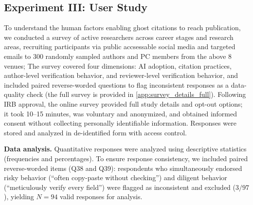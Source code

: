 \subsection{Experiment III: User Study}
\label{subsec:experiment_iii}

To understand the human factors enabling ghost citations to reach publication, we conducted a survey of active researchers across career stages and research areas, recruiting participants via public accsessable social media and targeted emails to 300 randomly sampled authors and PC members from the above 8 venues;  
The survey covered four dimensions: AI adoption, citation practices, author-level verification behavior, and reviewer-level verification behavior, and included paired reverse-worded questions to flag inconsistent responses as a data-quality check (the full survey is provided in \cref{app:survey_details_full}).
Following IRB approval, the online survey provided full study details and opt-out options; it took 10--15 minutes, was voluntary and anonymized, and obtained informed consent without collecting personally identifiable information. Responses were stored and analyzed in de-identified form with access control.

\noindent\textbf{Data analysis.} Quantitative responses were analyzed using descriptive statistics (frequencies and percentages). To ensure response consistency, we included paired reverse-worded items (Q38 and Q39): respondents who simultaneously endorsed risky behavior (``often copy-paste without checking'') and diligent behavior (``meticulously verify every field'') were flagged as inconsistent and excluded ($3/97$), yielding $N=94$ valid responses for analysis.
